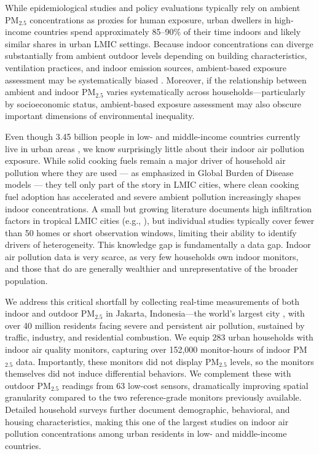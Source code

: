 \documentclass[9pt,twocolumn,twoside]{pnas-new}
\begin{document}
While epidemiological studies and policy evaluations typically rely on ambient PM$_{2.5}$ concentrations as proxies for human exposure, urban dwellers in high-income countries spend approximately 85–90\% of their time indoors \citep{klepeis_national_2001} and likely similar shares in urban LMIC settings.
Because indoor concentrations can diverge substantially from ambient outdoor levels depending on building characteristics, ventilation practices, and indoor emission sources, ambient-based exposure assessment may be systematically biased \citep{avery_estimating_2010, evangelopoulos_pm25_2020}. Moreover, if the relationship between ambient and indoor PM$_{2.5}$ varies systematically across households—particularly by socioeconomic status, ambient-based exposure assessment may also obscure important dimensions of environmental inequality. 

Even though 3.45 billion people in low- and middle-income countries currently live in urban areas \citep{noauthor_urban_2023}, we know surprisingly little about their indoor air pollution exposure. While solid cooking fuels remain a major driver of household air pollution where they are used --- as emphasized in Global Burden of Disease models \citep{bennitt_global_2025} --- they tell only part of the story in LMIC cities, where clean cooking fuel adoption has accelerated and severe ambient pollution increasingly shapes indoor concentrations.
A small but growing literature documents high infiltration factors in tropical LMIC cities (e.g., \cite{Sahaetal2025, GURLEY201311, Anandetal2022, Hossainetal2021, KAJJOBA20244184, zhou2011household, kephart2020indoor, fandino2020household}), but individual studies typically cover fewer than 50 homes or short observation windows, limiting their ability to identify drivers of heterogeneity. This knowledge gap is fundamentally a data gap. Indoor air pollution data is very scarce, as very few households own indoor monitors, and those that do are generally wealthier and unrepresentative of the broader population. 

We address this critical shortfall by collecting real-time measurements of both indoor and outdoor PM$_{2.5}$ in Jakarta, Indonesia—the world's largest city \citep{undesa2025wup}, with over 40 million residents facing severe and persistent air pollution, sustained by traffic, industry, and residential combustion. We equip 283 urban households with indoor air quality monitors, capturing over 152,000 monitor-hours of indoor PM$_{2.5}$ data. Importantly, these monitors did not display PM$_{2.5}$ levels, so the monitors themselves did not induce differential behaviors. We complement these with outdoor PM$_{2.5}$ readings from 63 low-cost sensors, dramatically improving spatial granularity compared to the two reference-grade monitors previously available. Detailed household surveys further document demographic, behavioral, and housing characteristics, making this one of the largest studies on indoor air pollution concentrations among urban residents in low- and middle-income countries. 
\end{document}
